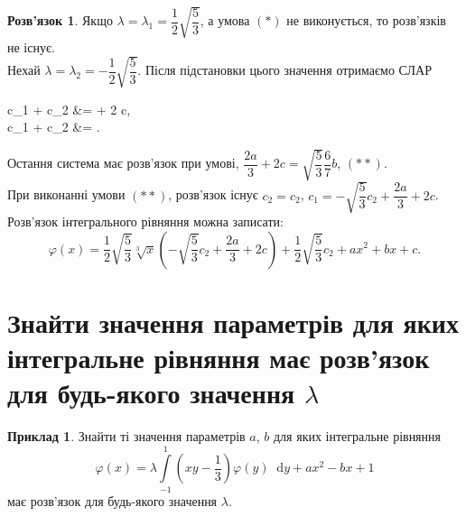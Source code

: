 \documentclass[a4paper, 12pt]{article}
\theoremstyle{definition}
\newtheorem*{example*}{Приклад}
\newtheorem*{solution*}{Розв'язок}
\newcommand{\Int}{\displaystyle\int\limits}
\newcommand*\diff{\mathop{}\!\mathrm{d}}
\renewcommand{\phi}{\varphi}
\newenvironment{system*}{\begin{equation*} \left\{\begin{aligned}}{\end{aligned} \right. \end{equation*}}
\begin{document}
\begin{solution*}
	Якщо $\lambda = \lambda_1 = \dfrac{1}{2} \sqrt{\dfrac{5}{3}}$, а умова $(*)$ не виконується, то розв'язків не існує. \\

	Нехай $\lambda = \lambda_2 = - \dfrac{1}{2} \sqrt{\dfrac{5}{3}}$. Після підстановки цього значення отримаємо СЛАР
	\begin{system*}
		c_1 +  c_2 &=  + 2 c, \\
		c_1 +  c_2 &=  .
	\end{system*}

	Остання система має розв'язок при умові, $\dfrac{2a}{3} + 2c = \sqrt{\dfrac{5}{3}} \dfrac{6}{7} b$, $(**)$. \\

	При виконанні умови $(**)$, розв’язок існує $c_2 = c_2$, $c_1 = - \sqrt{\dfrac{5}{3}} c_2 + \dfrac{2a}{3} + 2c$. \\

	Розв'язок інтегрального рівняння можна записати: \[ \phi(x) = \dfrac{1}{2} \sqrt{\dfrac{5}{3}} \sqrt[3]{x} \left( -\sqrt{\dfrac{5}{3}} c_2 + \dfrac{2a}{3} + 2c \right) + \dfrac{1}{2} \sqrt{\dfrac{5}{3}} c_2 + ax^2 + bx + c. \]
\end{solution*}

\newpage

\section{Знайти значення параметрів для яких інтегральне рівняння має розв'язок для будь-якого значення $\lambda$}

\begin{example*}
	Знайти ті значення параметрів $a$, $b$ для яких інтегральне рівняння \[\phi(x) = \lambda \Int_{-1}^1 \left( xy - \dfrac{1}{3} \right) \phi(y) \diff y + ax^2 - bx + 1 \] має розв'язок для будь-якого значення $\lambda$.
\end{example*}
\end{document}
